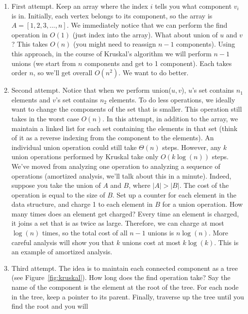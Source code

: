 \begin{enumerate}
    \item First attempt. Keep an array where the index $i$ tells you
    what
    component $v_i$ is in. Initially, each vertex belongs to its
    component, so the array is $A = [1, 2, 3, ..., n]$. We immediately
    notice that we can perform the find operation in
    $O(1)$ (just index into the array). What about union of $u$ and
    $v$? This takes $O(n)$ (you might need to reassign $n - 1$
    components). Using this approach, in
    the course of Kruskal's algorithm we will perform $n - 1$ unions 
    (we start from $n$ components and get to 1 component). Each takes
    order $n$, so we'll get overall $O(n^2)$. We want to do better.
    \item Second attempt. 
    Notice that when we perform union($u, v$), $u$'s set contains
    $n_1$ elements and $v$'s set contains $n_2$ elements. To do less
    operations, we ideally want to change the components of the set
    that is smaller. This operation still takes in the worst case $O
    (n)$. In this attempt, in addition to the array, we maintain a
    linked list for each set containing the elements in that set 
    (think of it as a reverse indexing from the component to the
    elements). An
    individual union operation could still take $\Theta(n)$ steps.
    However, any $k$ union operations performed by Kruskal take only
    $O(k\log(n))$ steps. We've moved from analyzing one operation to
    analyzing a sequence of operations (amortized analysis, we'll
    talk about this in a minute). Indeed, suppose you take the union
    of $A$ and $B$, where $|A| > |B|$. The cost of the operation is
    equal to the size of $B$. Set up a counter for each element in
    the data structure, and charge 1 to each element in $B$ for a
    union operation. How many times does an element get charged? Every
    time an element is charged, it joins a set that is as twice as
    large. Therefore, we can charge at most $\log(n)$ times, so the
    total cost of all $n - 1$ unions is $n\log(n)$. More careful
    analysis will show you that $k$ unions cost at most $k\log(k)$.
    This is an example of amortized analysis.
    \item Third attempt. The idea is to maintain each connected
    component as a tree (see Figure~\ref{fig:kruskal}). How long does
    the find operation
    take? Say
    the name of the component is the element at the root of the tree.
    For each node in the tree, keep a pointer to its parent.
    Finally, traverse up the tree until you find the root and you will

\end{enumerate}
